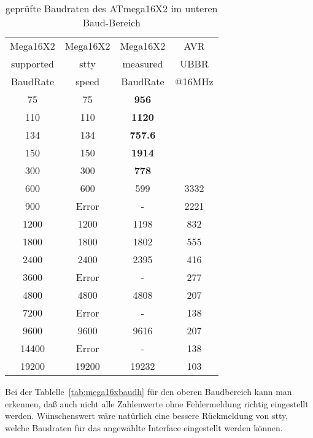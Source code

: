 \begin{table}[H]
  \begin{center}
    \begin{tabular}{| c | c | c || c |}
    \hline
    Mega16X2   & Mega16X2 & Mega16X2   & AVR \\
    supported  & stty  & measured  & UBBR  \\
    BaudRate   & speed & BaudRate  & @16MHz \\
    \hline
    \hline
         75    &  75   & \bf{956} &         \\
    \hline
        110    &  110  & \bf{1120}  &         \\
    \hline
        134    &  134  & \bf{757.6} &        \\
    \hline
        150    & 150   & \bf{1914} &         \\
    \hline
        300    & 300   & \bf{778}  &        \\
    \hline
        600    & 600   &  599     &   3332  \\
    \hline
        900    & Error &   -      &   2221 \\
    \hline
       1200    & 1200  &  1198    &    832  \\
    \hline
       1800    & 1800  &  1802    &    555 \\
    \hline
       2400    & 2400  &  2395    &    416  \\
    \hline
       3600    & Error &    -     &    277  \\
    \hline
       4800    & 4800  &  4808    &    207  \\
    \hline
       7200    & Error &    -     &    138  \\
    \hline
       9600    & 9600  &   9616   &    207  \\
    \hline
      14400    & Error &    -     &    138  \\
    \hline
      19200    & 19200  &  19232  &    103  \\
    \hline
    \end{tabular}
  \end{center}
  \caption{geprüfte Baudraten des ATmega16X2 im unteren Baud-Bereich}
  \label{tab:mega16xbaudl}
\end{table}

Bei der Tablelle~\ref{tab:mega16xbaudh} für den oberen Baudbereich kann man
erkennen, daß auch nicht alle Zahlenwerte ohne Fehlermeldung richtig
eingestellt werden. 
Wünschenswert wäre natürlich eine bessere Rückmeldung von stty, welche Baudraten
für das angewählte Interface eingestellt werden können. 

